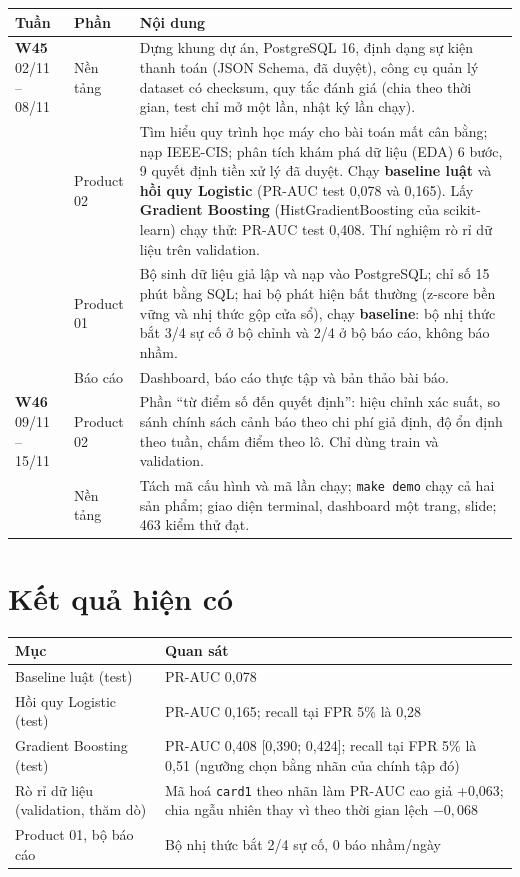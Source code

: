 \documentclass[11pt,a4paper]{article}
\begin{document}
\begin{small}
\renewcommand{\arraystretch}{1.25}
\begin{longtable}{@{}p{2.3cm}p{2.3cm}p{11.3cm}@{}}
\toprule
\textbf{Tuần} & \textbf{Phần} & \textbf{Nội dung} \\
\midrule
\endhead
\textbf{W45} 02/11 – 08/11 & Nền tảng & Dựng khung dự án, PostgreSQL 16, định dạng sự kiện thanh toán (JSON Schema, đã duyệt), công cụ quản lý dataset có checksum, quy tắc đánh giá (chia theo thời gian, test chỉ mở một lần, nhật ký lần chạy). \\
 & Product 02 & Tìm hiểu quy trình học máy cho bài toán mất cân bằng; nạp IEEE-CIS; phân tích khám phá dữ liệu (EDA) 6 bước, 9 quyết định tiền xử lý đã duyệt. Chạy \textbf{baseline luật} và \textbf{hồi quy Logistic} (PR-AUC test 0,078 và 0,165). Lấy \textbf{Gradient Boosting} (HistGradientBoosting của scikit-learn) chạy thử: PR-AUC test 0,408. Thí nghiệm rò rỉ dữ liệu trên validation. \\
 & Product 01 & Bộ sinh dữ liệu giả lập và nạp vào PostgreSQL; chỉ số 15 phút bằng SQL; hai bộ phát hiện bất thường (z-score bền vững và nhị thức gộp cửa sổ), chạy \textbf{baseline}: bộ nhị thức bắt 3/4 sự cố ở bộ chỉnh và 2/4 ở bộ báo cáo, không báo nhầm. \\
 & Báo cáo & Dashboard, báo cáo thực tập và bản thảo bài báo. \\
\addlinespace
\textbf{W46} 09/11 – 15/11 & Product 02 & Phần “từ điểm số đến quyết định”: hiệu chỉnh xác suất, so sánh chính sách cảnh báo theo chi phí giả định, độ ổn định theo tuần, chấm điểm theo lô. Chỉ dùng train và validation. \\
 & Nền tảng & Tách mã cấu hình và mã lần chạy; \texttt{make demo} chạy cả hai sản phẩm; giao diện terminal, dashboard một trang, slide; 463 kiểm thử đạt. \\
\bottomrule
\end{longtable}
\end{small}

\section{Kết quả hiện có}

\begin{small}
\renewcommand{\arraystretch}{1.25}
\begin{tabularx}{\textwidth}{@{}p{4.6cm}X@{}}
\toprule
\textbf{Mục} & \textbf{Quan sát} \\
\midrule
Baseline luật (test) & PR-AUC 0,078 \\
Hồi quy Logistic (test) & PR-AUC 0,165; recall tại FPR 5\% là 0,28 \\
Gradient Boosting (test) & PR-AUC 0,408 [0,390; 0,424]; recall tại FPR 5\% là 0,51 (ngưỡng chọn bằng nhãn của chính tập đó) \\
Rò rỉ dữ liệu (validation, thăm dò) & Mã hoá \texttt{card1} theo nhãn làm PR-AUC cao giả +0,063; chia ngẫu nhiên thay vì theo thời gian lệch $-0{,}068$ \\
Product 01, bộ báo cáo & Bộ nhị thức bắt 2/4 sự cố, 0 báo nhầm/ngày \\
\bottomrule
\end{tabularx}
\end{small}
\end{document}

